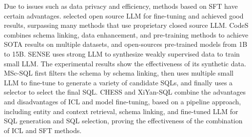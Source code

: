 Due to issues such as data privacy and efficiency, methods based on SFT have certain advantages. \citep{pourreza-rafiei-2024-dts,li_codes_2024, gorti2024msc} selected open source LLM for fine-tuning and achieved good results, surpassing many methods that use proprietary closed source LLM. CodeS\citep{li_codes_2024} combines schema linking, data enhancement, and pre-training methods to achieve SOTA results on multiple datasets, and open-sources pre-trained models from 1B to 15B. SENSE\citep{yang_synthesizing_2024} uses strong LLM to synthesize weakly supervised data to train small LLM. The experimental results show the effectiveness of its synthetic data.  MSc-SQL\citep{gorti2024msc} first filters the schema by schema linking, then uses multiple small LLM to fine-tune to generate a variety of candidate SQLs, and finally uses a selector to select the final SQL. CHESS\citep{talaei_chess_2024} and XiYan-SQL\citep{xiyansql} combine the advantages and disadvantages of ICL and model fine-tuning, based on a pipeline approach, including entity and context retrieval, schema linking, and fine-tuned LLM for SQL generation and SQL selection, proving the effectiveness of the combination of ICL and SFT methods.

